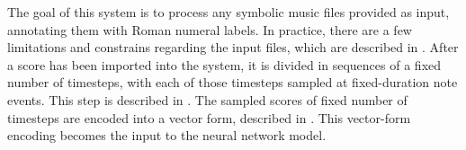 

The goal of this system is to process any symbolic music
files provided as input, annotating them with Roman numeral
labels. In practice, there are a few limitations and
constrains regarding the input files, which are described in
. After a score has
been imported into the system, it is divided in sequences of
a fixed number of timesteps, with each of those timesteps
sampled at fixed-duration note events. This step is
described in . The sampled
scores of fixed number of timesteps are encoded into a
vector form, described in . This
vector-form encoding becomes the input to the neural network
model.
